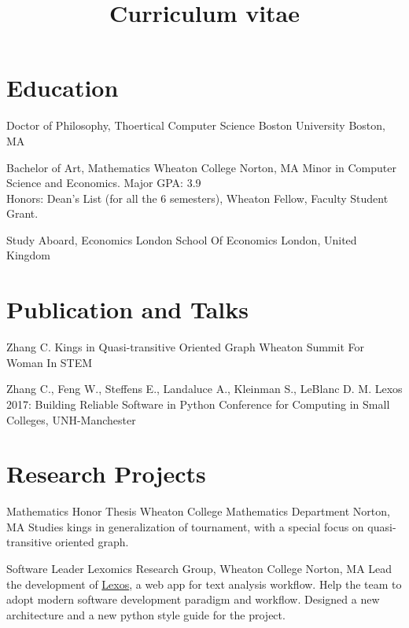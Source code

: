 \documentclass[11pt,a4paper,roman]{moderncv}        %
\title{Curriculum vitae}
\begin{document}

\makecvtitle{}

\setlength{\parskip}{2.5px}


\section{Education}

{Doctor of Philosophy, Thoertical Computer Science}
{Boston University}
{Boston, MA} {}
{}  %

{Bachelor of Art, Mathematics}
{Wheaton College}
{Norton, MA} {}
{Minor in Computer Science and Economics. Major GPA\@: 3.9\\
Honors: Dean's List (for all the 6 semesters), Wheaton Fellow, Faculty Student Grant.}

{Study Aboard, Economics}
{London School Of Economics}
{London, United Kingdom}{}
{}  %



\section{Publication and Talks}

{Zhang C.}
{Kings in Quasi-transitive Oriented Graph}
{Wheaton Summit For Woman In STEM}
{}{}

{Zhang C., Feng W., Steffens E., Landaluce A., Kleinman S., LeBlanc D. M.}
{Lexos 2017: Building Reliable Software in Python}
{Conference for Computing in Small Colleges, UNH-Manchester}
{}{}



\section{Research Projects}
{Mathematics Honor Thesis}
{Wheaton College Mathematics Department}
{Norton, MA}{}
{Studies kings in generalization of tournament,
with a special focus on quasi-transitive oriented graph.}


{Software Leader}
{Lexomics Research Group, Wheaton College}
{Norton, MA}{}
{Lead the development of \href{https://github.com/WheatonCS/Lexos}{Lexos}, a web app for text analysis workflow.
Help the team to adopt modern software development paradigm and workflow.
Designed a new architecture and a new python style guide for the project.}
\end{document}
